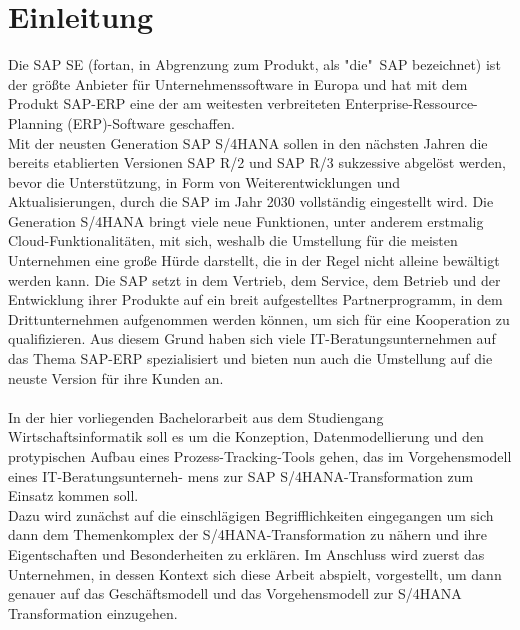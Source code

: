\section{Einleitung}
Die SAP SE (fortan, in Abgrenzung zum Produkt, als "die"\ SAP bezeichnet) ist der größte Anbieter für Unternehmenssoftware in Europa und hat mit dem Produkt SAP-ERP eine der am weitesten verbreiteten Enterprise-Ressource-Planning (ERP)-Software geschaffen. \\Mit der neusten Generation SAP S/4HANA sollen in den nächsten Jahren die bereits etablierten Versionen SAP R/2 und SAP R/3 sukzessive abgelöst werden, bevor die Unterstützung, in Form von Weiterentwicklungen und Aktualisierungen, durch die SAP im Jahr 2030 vollständig eingestellt wird. Die Generation S/4HANA bringt viele neue Funktionen, unter anderem erstmalig Cloud-Funktionalitäten, mit sich, weshalb die Umstellung für die meisten Unternehmen eine große Hürde darstellt, die in der Regel nicht alleine bewältigt werden kann. Die SAP setzt in dem Vertrieb, dem Service, dem Betrieb und der Entwicklung ihrer Produkte auf ein breit aufgestelltes Partnerprogramm, in dem Drittunternehmen aufgenommen werden können, um sich für eine Kooperation zu qualifizieren. Aus diesem Grund haben sich viele IT-Beratungsunternehmen auf das Thema SAP-ERP spezialisiert und bieten nun auch die Umstellung auf die neuste Version für ihre Kunden an.
\\\\
In der hier vorliegenden Bachelorarbeit aus dem Studiengang Wirtschaftsinformatik soll es um die Konzeption, Datenmodellierung und den protypischen Aufbau eines Prozess-Tracking-Tools gehen, das im Vorgehensmodell eines IT-Beratungsunterneh- mens zur SAP S/4HANA-Transformation zum Einsatz kommen soll.\\ Dazu wird zunächst auf die einschlägigen Begrifflichkeiten eingegangen um sich dann dem Themenkomplex der S/4HANA-Transformation zu nähern und ihre Eigentschaften und Besonderheiten zu erklären. Im Anschluss wird zuerst das Unternehmen, in dessen Kontext sich diese Arbeit abspielt, vorgestellt, um dann genauer auf das Geschäftsmodell und das Vorgehensmodell zur S/4HANA Transformation einzugehen. \\

